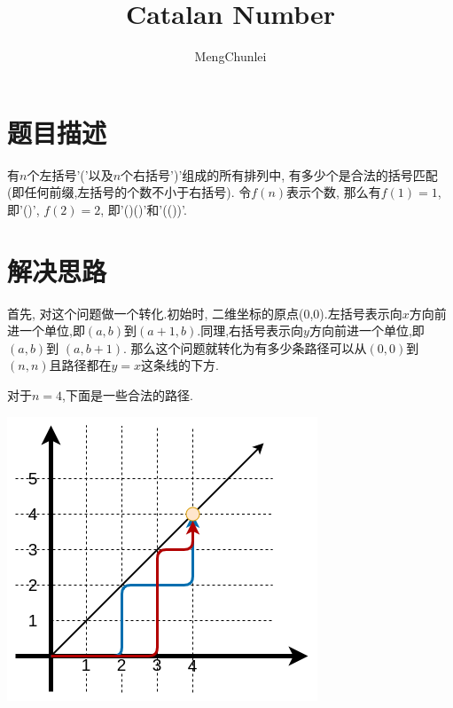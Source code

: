 \documentclass{article}
\title{Catalan Number}
\author{MengChunlei}
\begin{document}
\maketitle
\section{题目描述}
有$n$个左括号'('以及$n$个右括号')'组成的所有排列中, 有多少个是合法的括号匹配(即任何前缀,左括号的个数不小于右括号). 令$f(n)$表示个数, 那么有$f(1)=1$, 即'()', $f(2)=2$, 即'()()'和'(())'.
\section{解决思路}
首先, 对这个问题做一个转化.初始时, 二维坐标的原点(0,0).左括号表示向$x$方向前进一个单位,即$(a,b)$到$(a+1,b)$.同理,右括号表示向$y$方向前进一个单位,即$(a,b)$到 $(a,b+1)$. 那么这个问题就转化为有多少条路径可以从$(0,0)$到$(n,n)$且路径都在$y=x$这条线的下方. \par
对于$n=4$,下面是一些合法的路径.\par
\includegraphics[scale=0.8]{pic1.png} \par
\end{document}
